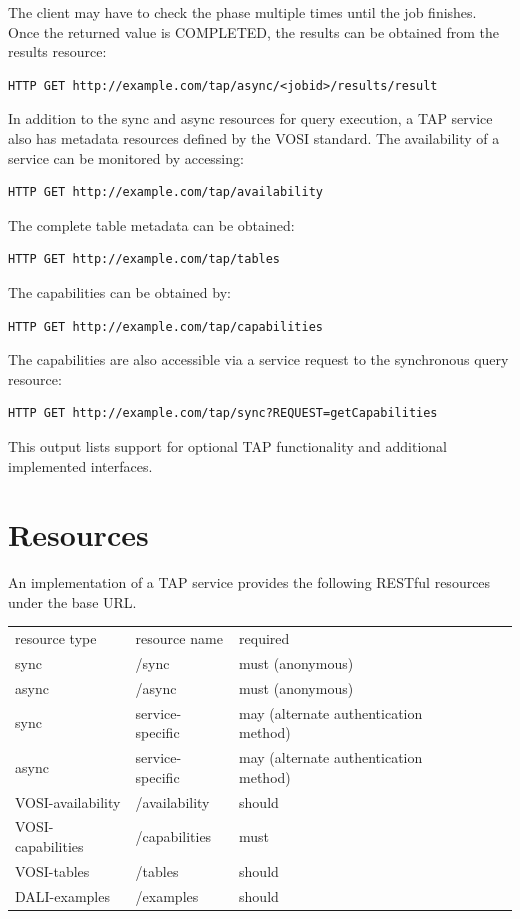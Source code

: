 \documentclass[11pt,letter]{ivoa}
\begin{document}
The client may have to check the phase multiple times until the job 
finishes. Once the returned value is COMPLETED, the results can be obtained 
from the results resource:

\begin{verbatim}
HTTP GET http://example.com/tap/async/<jobid>/results/result
\end{verbatim}

In addition to the sync and async resources for query execution, a TAP service 
also has metadata resources defined by the VOSI standard. The availability of a 
service can be monitored by accessing:

\begin{verbatim}
HTTP GET http://example.com/tap/availability
\end{verbatim}

The complete table metadata can be obtained:

\begin{verbatim}
HTTP GET http://example.com/tap/tables
\end{verbatim}

The capabilities can be obtained by:

\begin{verbatim}
HTTP GET http://example.com/tap/capabilities
\end{verbatim}

The capabilities are also accessible via a service request to the synchronous 
query resource:

\begin{verbatim}
HTTP GET http://example.com/tap/sync?REQUEST=getCapabilities
\end{verbatim}

This output lists support for optional TAP functionality and additional 
implemented interfaces.

\section{Resources}
\label{sec:resources}

An implementation of a TAP service provides the following RESTful resources 
under the base URL.

\begin{tabular}{l l l l l}
\label{tab:resources}
resource type & resource name & required \\
{sync} & /sync & must (anonymous) & \\
{async} & /async & must (anonymous) & \\
{sync} & service-specific & may (alternate authentication method) & \\
{async} & service-specific & may (alternate authentication method) & \\
VOSI-availability & /availability & should & \\
VOSI-capabilities & /capabilities & must & \\
VOSI-tables & /tables & should & \\
DALI-examples & /examples & should & \\
\end{tabular}
\end{document}
